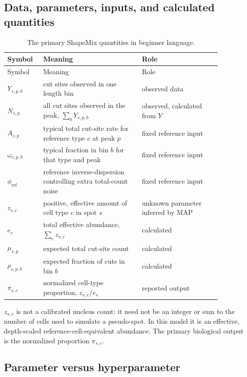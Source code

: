 \documentclass[11pt]{article}
\begin{document}
\subsection{Data, parameters, inputs, and calculated quantities}

\begin{longtable}{L{0.13\linewidth}L{0.41\linewidth}L{0.33\linewidth}}
\caption{The primary ShapeMix quantities in beginner language.}\label{tab:symbols}\\
\toprule
Symbol & Meaning & Role \\
\midrule
\endfirsthead
\toprule
Symbol & Meaning & Role \\
\midrule
\endhead
\(Y_{s,p,b}\) & cut sites observed in one length bin & observed data \\
\(N_{s,p}\) & all cut sites observed in the peak, \(\sum_bY_{s,p,b}\) & observed, calculated from \(Y\) \\
\(A_{c,p}\) & typical total cut-site rate for reference type \(c\) at peak \(p\) & fixed reference input \\
\(\omega_{c,p,b}\) & typical fraction in bin \(b\) for that type and peak & fixed reference input \\
\(\phi_{\mathrm{ref}}\) & reference inverse-dispersion controlling extra total-count noise & fixed reference input \\
\(z_{s,c}\) & positive, effective amount of cell type \(c\) in spot \(s\) & unknown parameter inferred by MAP \\
\(e_s\) & total effective abundance, \(\sum_cz_{s,c}\) & calculated \\
\(\mu_{s,p}\) & expected total cut-site count & calculated \\
\(\rho_{s,p,b}\) & expected fraction of cuts in bin \(b\) & calculated \\
\(\pi_{s,c}\) & normalized cell-type proportion, \(z_{s,c}/e_s\) & reported output \\
\bottomrule
\end{longtable}

\begin{watchout}
\(z_{s,c}\) is not a calibrated nucleus count: it need not be an integer or sum
to the number of cells used to simulate a pseudo-spot. In this model it is an
effective, depth-scaled reference-cell-equivalent abundance. The primary
biological output is the normalized proportion \(\pi_{s,c}\).
\end{watchout}

\subsection{Parameter versus hyperparameter}
\end{document}
